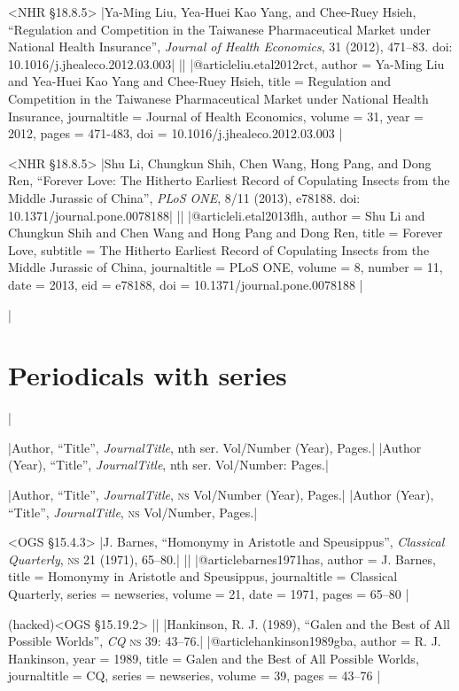 \documentclass[extrafontsizes,11pt,a4paper,oneside]{memoir}
\newcommand*{\lit}[1]{\textsf{#1}}
\begin{document}
\bibexample<NHR \S18.8.5>
|Ya-Ming Liu, Yea-Huei Kao Yang, and Chee-Ruey Hsieh, \enquote{Regulation and Competition in the Taiwanese Pharmaceutical Market under National Health Insurance}, \emph{Journal of Health Economics}, 31 (2012), 471–83. doi: 10.1016/j.jhealeco.2012.03.003|%
||%
|@article{liu.etal2012rct,
  author = {Ya-Ming Liu and Yea-Huei Kao Yang and Chee-Ruey Hsieh},
  title = {Regulation and Competition in the Taiwanese Pharmaceutical Market under National Health Insurance},
  journaltitle = {Journal of Health Economics},
  volume = {31},
  year = {2012},
  pages = {471-483},
  doi = {10.1016/j.jhealeco.2012.03.003}
}|

\bibexample<NHR \S18.8.5>
|Shu Li, Chungkun Shih, Chen Wang, Hong Pang, and Dong Ren, \enquote{Forever Love: The Hitherto Earliest Record of Copulating Insects from the Middle Jurassic of China}, \emph{PLoS ONE}, 8/11 (2013), e78188. doi: 10.1371/journal.pone.0078188|%
||%
|@article{li.etal2013flh,
  author = {Shu Li and Chungkun Shih and Chen Wang and Hong Pang and Dong Ren},
  title = {Forever Love},
  subtitle = {The Hitherto Earliest Record of Copulating Insects from the Middle Jurassic of China},
  journaltitle = {PLoS ONE},
  volume = {8},
  number = {11},
  date = {2013},
  eid = {e78188},
  doi = {10.1371/journal.pone.0078188}
}|

\todoc|
\section{Periodicals with series}
|

\specs
|Author, \enquote{Title}, \emph{JournalTitle}, nth \lit{ser}. Vol/Number (Year), Pages.|%
|Author (Year), \enquote{Title}, \emph{JournalTitle}, nth \lit{ser}. Vol/Number: Pages.|

\specs
|Author, \enquote{Title}, \emph{JournalTitle}, \textsc{ns} Vol/Number (Year), Pages.|%
|Author (Year), \enquote{Title}, \emph{JournalTitle}, \textsc{ns} Vol/Number, Pages.|

\bibexample<OGS \S15.4.3>
|J. Barnes, \enquote{Homonymy in Aristotle and Speusippus}, \emph{Classical Quarterly}, \textsc{ns} 21 (1971), 65--80.|%
||%
|@article{barnes1971has,
  author = {J. Barnes},
  title = {Homonymy in Aristotle and Speusippus},
  journaltitle = {Classical Quarterly},
  series = {newseries},
  volume = {21},
  date = {1971},
  pages = {65--80}
}|

\bibexample(hacked)<OGS \S15.19.2>
||%
|Hankinson, R. J. (1989), \enquote{Galen and the Best of All Possible Worlds}, \emph{CQ} \textsc{ns} 39: 43–76.|%
|@article{hankinson1989gba,
  author = {R. J. Hankinson},
  year = {1989},
  title = {Galen and the Best of All Possible Worlds},
  journaltitle = {CQ\nopunct},
  series = {newseries},
  volume = {39},
  pages = {43–76}
}|
\end{document}
